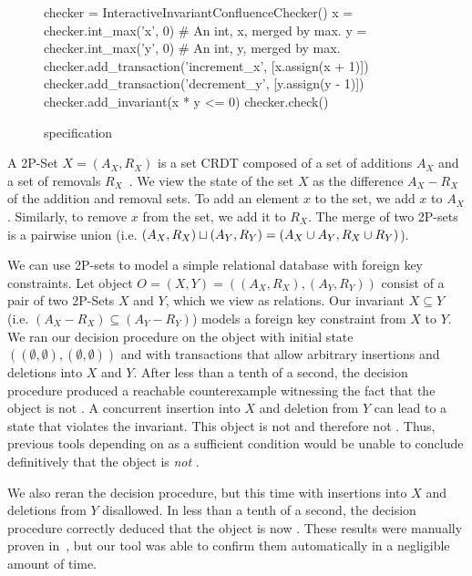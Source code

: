 \begin{figure}[ht]
  \begin{Python}[gobble=4]
    checker = InteractiveInvariantConfluenceChecker()
    x = checker.int_max('x', 0) # An int, x, merged by max.
    y = checker.int_max('y', 0) # An int, y, merged by max.
    checker.add_transaction('increment_x', [x.assign(x + 1)])
    checker.add_transaction('decrement_y', [y.assign(y - 1)])
    checker.add_invariant(x * y <= 0)
    checker.check()
  \end{Python}
  \caption{ specification}
\end{figure}

A 2P-Set $X = (A_X, R_X)$ is a set CRDT composed of a set of additions $A_X$
and a set of removals $R_X$~\cite{shapiro2011comprehensive}. We view the state
of the set $X$ as the difference $A_X - R_X$ of the addition and removal sets.
To add an element $x$ to the set, we add $x$ to $A_X$. Similarly, to remove $x$
from the set, we add it to $R_X$. The merge of two 2P-sets is a pairwise union
(i.e. $(A_X, R_X) \sqcup (A_Y, R_Y) = (A_X \cup A_Y, R_X \cup R_Y)$).

We can use 2P-sets to model a simple relational database with foreign key
constraints. Let object $O = (X, Y) = ((A_X, R_X), (A_Y, R_Y))$ consist of a
pair of two 2P-Sets $X$ and $Y$, which we view as relations. Our invariant $X
\subseteq Y$ (i.e. $(A_X - R_X) \subseteq (A_Y - R_Y)$) models a foreign key
constraint from $X$ to $Y$. We ran our decision procedure on the object with
initial state $((\emptyset, \emptyset), (\emptyset, \emptyset))$ and with
transactions that allow arbitrary insertions and deletions into $X$ and $Y$.
After less than a tenth of a second, the decision procedure produced a
reachable counterexample witnessing the fact that the object is not
\invariantconfluent{}. A concurrent insertion into $X$ and deletion from $Y$
can lead to a state that violates the invariant. This object is not
\invariantconfluent{} and therefore not \invariantclosed{}. Thus, previous
tools depending on \invariantclosure{} as a sufficient condition would be
unable to conclude definitively that the object is \emph{not}
\invariantconfluent{}.

We also reran the decision procedure, but this time with insertions into $X$
and deletions from $Y$ disallowed. In less than a tenth of a second, the
decision procedure correctly deduced that the object is now
\invariantconfluent{}. These results were manually proven
in~\cite{bailis2014coordination}, but our tool was able to confirm them
automatically in a negligible amount of time.

